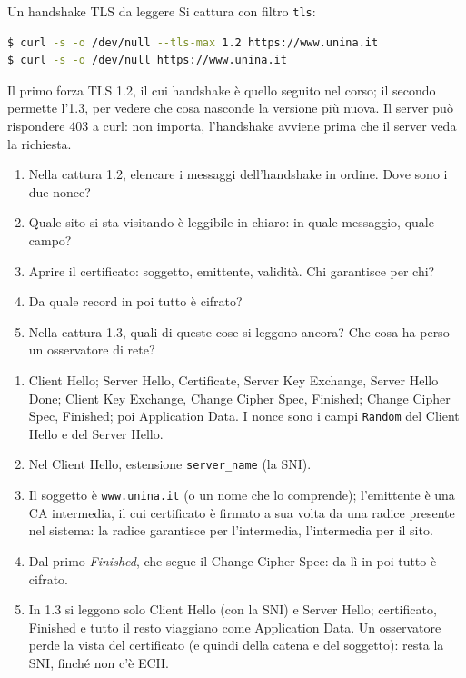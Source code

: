 \begin{esercizio}{Un handshake TLS da leggere}
Si cattura con filtro \texttt{tls}:
\begin{lstlisting}[language=bash]
$ curl -s -o /dev/null --tls-max 1.2 https://www.unina.it
$ curl -s -o /dev/null https://www.unina.it
\end{lstlisting}
Il primo forza TLS 1.2, il cui handshake è quello seguito nel corso; il secondo permette l'1.3, per vedere che cosa nasconde la versione
più nuova. Il server può rispondere 403 a curl: non importa, l'handshake avviene prima che il server veda la richiesta.
\begin{enumerate}[label=(\alph*)]
    \item Nella cattura 1.2, elencare i messaggi dell'handshake in ordine. Dove sono i due nonce?
    \item Quale sito si sta visitando è leggibile in chiaro: in quale messaggio, quale campo?
    \item Aprire il certificato: soggetto, emittente, validità. Chi garantisce per chi?
    \item Da quale record in poi tutto è cifrato?
    \item Nella cattura 1.3, quali di queste cose si leggono ancora? Che cosa ha perso un osservatore di rete?
\end{enumerate}

\svolgimento
\begin{enumerate}[label=(\alph*)]
    \item Client Hello; Server Hello, Certificate, Server Key Exchange, Server Hello Done; Client Key Exchange, Change Cipher Spec, Finished;
          Change Cipher Spec, Finished; poi Application Data. I nonce sono i campi \texttt{Random} del Client Hello e del Server Hello.
    \item Nel Client Hello, estensione \texttt{server\_name} (la SNI).
    \item Il soggetto è \texttt{www.unina.it} (o un nome che lo comprende); l'emittente è una CA intermedia, il cui certificato è firmato a
          sua volta da una radice presente nel sistema: la radice garantisce per l'intermedia, l'intermedia per il sito.
    \item Dal primo \emph{Finished}, che segue il Change Cipher Spec: da lì in poi tutto è cifrato.
    \item In 1.3 si leggono solo Client Hello (con la SNI) e Server Hello; certificato, Finished e tutto il resto viaggiano come Application
          Data. Un osservatore perde la vista del certificato (e quindi della catena e del soggetto): resta la SNI, finché non c'è ECH.
\end{enumerate}
\end{esercizio}

